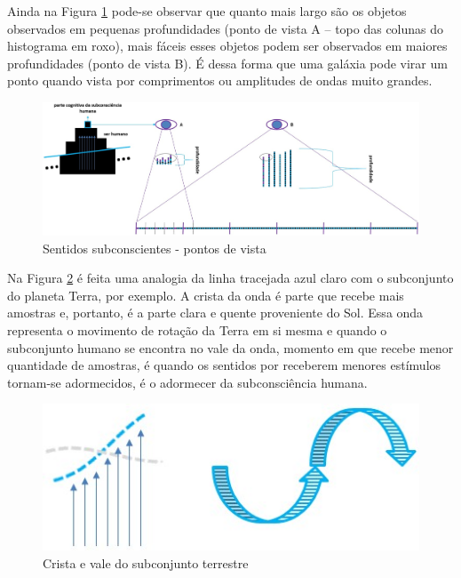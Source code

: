 Ainda na Figura \ref{fig:consciousness_amplitude_viewpoint}  pode-se observar que quanto mais largo são os objetos observados em pequenas profundidades (ponto de vista A – topo das colunas do histograma em roxo), mais fáceis esses objetos podem ser observados em maiores profundidades (ponto de vista B). É dessa forma que uma galáxia pode virar um ponto quando vista por comprimentos ou amplitudes de ondas muito grandes.
	\begin{figure}[H]
	\caption{Sentidos subconscientes - pontos de vista}
	\label{fig:consciousness_amplitude_viewpoint}
	\centering
	\includegraphics[scale=.4]{sections/images/consciousness_amplitude_viewpoint.jpg}
	\end{figure}

Na Figura \ref{fig:consciousness_amplitude_crest_valley} é feita uma analogia da linha tracejada azul claro com o subconjunto do planeta Terra, por exemplo. A crista da onda é parte que recebe mais amostras e, portanto, é a parte clara e quente proveniente do Sol. Essa onda representa o movimento de rotação da Terra em si mesma e quando o subconjunto humano se encontra no vale da onda, momento em que recebe menor quantidade de amostras, é quando os sentidos por receberem menores estímulos tornam-se adormecidos, é o adormecer da subconsciência humana.
	\begin{figure}[H]
	\caption{Crista e vale do subconjunto terrestre}
	\label{fig:consciousness_amplitude_crest_valley}
	\centering
	\includegraphics[scale=.6]{sections/images/consciousness_amplitude_crest_valley.jpg}
	\end{figure}
	
